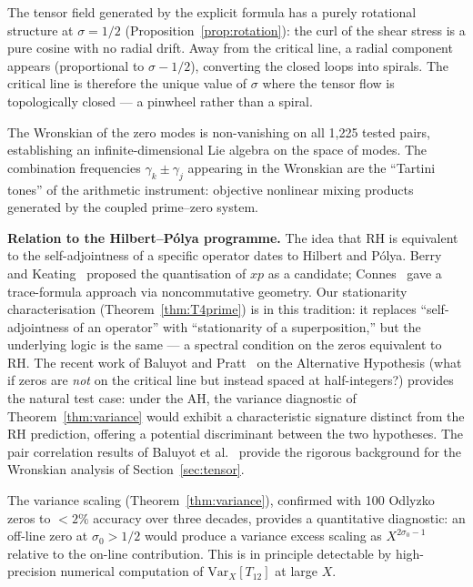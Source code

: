 \documentclass[11pt,a4paper]{article}
\theoremstyle{plain}
\theoremstyle{definition}
\theoremstyle{remark}
\begin{document}
The tensor field generated by the explicit formula has a purely rotational
structure at $\sigma = 1/2$ (Proposition~\ref{prop:rotation}): the curl of
the shear stress is a pure cosine with no radial drift.  Away from the
critical line, a radial component appears (proportional to $\sigma - 1/2$),
converting the closed loops into spirals.  The critical line is therefore
the unique value of $\sigma$ where the tensor flow is topologically
closed --- a pinwheel rather than a spiral.

The Wronskian of the zero modes is non-vanishing on all 1{,}225 tested
pairs, establishing an infinite-dimensional Lie algebra on the space of
modes.  The combination frequencies $\gamma_k \pm \gamma_j$ appearing in
the Wronskian are the ``Tartini tones'' of the arithmetic instrument:
objective nonlinear mixing products generated by the coupled prime--zero
system.

\textbf{Relation to the Hilbert--P\'{o}lya programme.}
The idea that RH is equivalent to the self-adjointness of a specific
operator dates to Hilbert and P\'{o}lya.  Berry and
Keating~\cite{BerryKeating1999} proposed the quantisation of $xp$
as a candidate; Connes~\cite{Connes1999} gave a trace-formula approach
via noncommutative geometry.  Our stationarity characterisation
(Theorem~\ref{thm:T4prime}) is in this tradition: it replaces
``self-adjointness of an operator'' with ``stationarity of a
superposition,'' but the underlying logic is the same --- a spectral
condition on the zeros equivalent to RH.  The recent work of
Baluyot and Pratt~\cite{AltHyp2025} on the Alternative Hypothesis
(what if zeros are \emph{not} on the critical line but instead
spaced at half-integers?) provides the natural test case: under the
AH, the variance diagnostic of Theorem~\ref{thm:variance} would
exhibit a characteristic signature distinct from the RH prediction,
offering a potential discriminant between the two hypotheses.
The pair correlation results of Baluyot
et al.~\cite{PairCorr2025} provide the rigorous background for
the Wronskian analysis of Section~\ref{sec:tensor}.

The variance scaling (Theorem~\ref{thm:variance}), confirmed with 100
Odlyzko zeros to $<\!2\%$ accuracy over three decades, provides
a quantitative diagnostic: an off-line zero at $\sigma_0 > 1/2$ would
produce a variance excess scaling as $X^{2\sigma_0 - 1}$ relative to the
on-line contribution.  This is in principle detectable by high-precision
numerical computation of $\mathrm{Var}_X[T_{12}]$ at large $X$.
\end{document}
